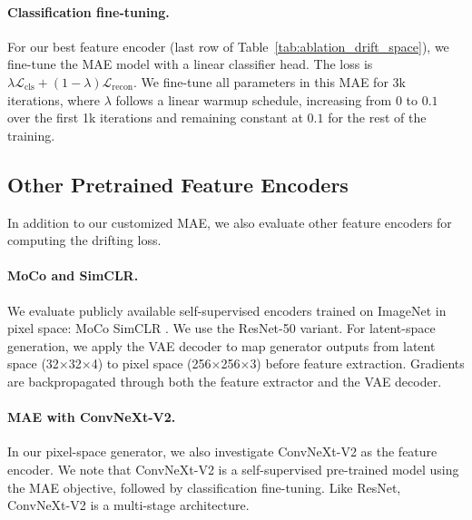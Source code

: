 \paragraph{Classification fine-tuning.}
For our best feature encoder (last row of Table~\ref{tab:ablation_drift_space}), we fine-tune the MAE model with a linear classifier head.
The loss is $\lambda \mathcal{L}_{\text{cls}} + (1-\lambda)\mathcal{L}_{\text{recon}}$. We fine-tune all parameters in this MAE for 3k iterations, where $\lambda$ follows a linear warmup schedule, increasing from $0$ to $0.1$ over the first 1k iterations and remaining constant at $0.1$ for the rest of the training.


\subsection{Other Pretrained Feature Encoders}
\label{sec:appendix_other_encoders}

In addition to our customized MAE, we also evaluate other feature encoders for computing the drifting loss.

\paragraph{MoCo and SimCLR.} We evaluate publicly available self-supervised encoders trained on ImageNet in pixel space: MoCo \cite{he2020momentum,chen2020improved} SimCLR \cite{chen2020simple}. We use the ResNet-50 variant. 
For latent-space generation, we apply the VAE decoder to map generator outputs from latent space (32${\times}$32${\times}$4) to pixel space (256${\times}$256${\times}$3) before feature extraction.
Gradients are backpropagated through both the feature extractor and the VAE decoder.

\paragraph{MAE with ConvNeXt-V2.} In our pixel-space generator, we also investigate ConvNeXt-V2 \citep{woo2023convnext} as the feature encoder. We note that ConvNeXt-V2 is a self-supervised pre-trained model using the MAE objective, followed by classification fine-tuning. Like ResNet, ConvNeXt-V2 is a multi-stage architecture.

